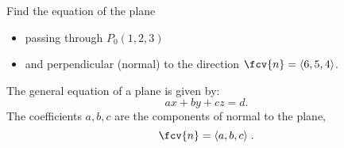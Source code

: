 \begin{frame}
\begin{example}
Find the equation of the plane
\begin{itemize}
\item passing through $P_0(1,2,3)$ 
\item and perpendicular (normal) to the direction $ \fcv{n} = \langle 6,5,4\rangle$.
\end{itemize}
%

\end{example}
\pause The general equation of a plane is given by:
%
$$ax+by+cz = d .$$
%
The coefficients $a,b,c$ are \pause the components of normal to the plane,
%
$$ \fcv{n} = \langle a,b,c\rangle\; .$$

\end{frame}